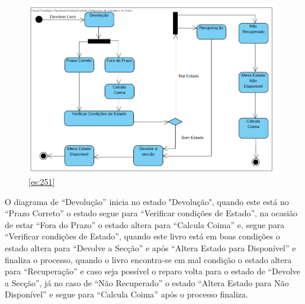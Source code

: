 \subsection{}

\begin{figure}[H]
	\centering
	\includegraphics[width=1\linewidth]{./img/Diagrama_E/DE_Devolucao.png}  %
	\caption{\ref{es:251}}
	\label{fig:chap251}
\end{figure}

\par O diagrama de “Devolução” inicia no estado "Devolução", quando este está no “Prazo Correto” o estado segue para “Verificar condições de Estado”, na ocasião de estar “Fora do Prazo” o estado altera para “Calcula Coima”  e, segue para “Verificar condições de Estado”, quando este livro está em boas condições o estado altera para “Devolve a Secção” e após “Altera Estado para Disponível” e finaliza o processo, quando o livro encontra-se em mal condição o estado altera para “Recuperação” e caso seja possível o reparo volta para o estado de “Devolve a Secção”, já no caso de “Não Recuperado” o estado “Altera Estado para Não Disponível” e segue para “Calcula Coima” após o processo finaliza.
